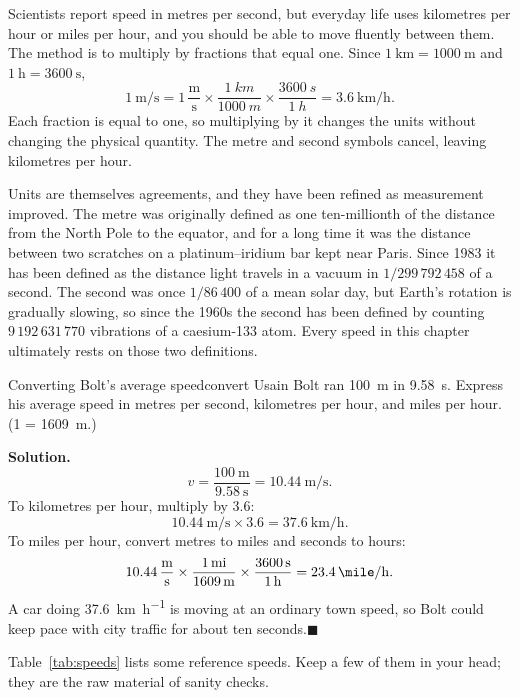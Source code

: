 \documentclass[11pt,twoside,openany]{book}
\newcounter{check}[chapter]
\newcommand{\solution}{\par\smallskip\noindent\textbf{Solution.}\ }
\newcommand{\qed}{\hfill$\blacksquare$}
\begin{document}
Scientists report speed in metres per second, but everyday life uses kilometres per hour or miles per hour, and you should be able to move fluently between them. The method is to multiply by fractions that equal one. Since $\SI{1}{\kilo\metre} = \SI{1000}{\metre}$ and $\SI{1}{\hour} = \SI{3600}{\second}$,
\[
\SI{1}{\metre\per\second}
 = 1\,\frac{\text{m}}{\text{s}}\times\frac{\SI{1}{km}}{\SI{1000}{m}}\times\frac{\SI{3600}{s}}{\SI{1}{h}}
 = \SI{3.6}{\kilo\metre\per\hour}.
\]
Each fraction is equal to one, so multiplying by it changes the units without changing the physical quantity. The metre and second symbols cancel, leaving kilometres per hour.

\begin{modelnote}
Units are themselves agreements, and they have been refined as measurement improved. The metre was originally defined as one ten-millionth of the distance from the North Pole to the equator, and for a long time it was the distance between two scratches on a platinum--iridium bar kept near Paris. Since 1983 it has been defined as the distance light travels in a vacuum in $1/299\,792\,458$ of a second. The second was once $1/86\,400$ of a mean solar day, but Earth's rotation is gradually slowing, so since the 1960s the second has been defined by counting $9\,192\,631\,770$ vibrations of a caesium-133 atom. Every speed in this chapter ultimately rests on those two definitions.
\end{modelnote}

\begin{example}{Converting Bolt's average speed}{convert}
Usain Bolt ran \SI{100}{\metre} in \SI{9.58}{\second}. Express his average speed in metres per second, kilometres per hour, and miles per hour. (\SI{1}{\mile} = \SI{1609}{\metre}.)

\solution
\[
v = \frac{\SI{100}{\metre}}{\SI{9.58}{\second}} = \SI{10.44}{\metre\per\second}.
\]
To kilometres per hour, multiply by \num{3.6}:
\[
\SI{10.44}{\metre\per\second}\times 3.6 = \SI{37.6}{\kilo\metre\per\hour}.
\]
To miles per hour, convert metres to miles and seconds to hours:
\[
10.44\,\frac{\text{m}}{\text{s}}\times\frac{\SI{1}{mi}}{\SI{1609}{m}}\times\frac{\SI{3600}{s}}{\SI{1}{h}} = \SI{23.4}{\mile\per\hour}.
\]
A car doing \SI{37.6}{\kilo\metre\per\hour} is moving at an ordinary town speed, so Bolt could keep pace with city traffic for about ten seconds.\qed
\end{example}

Table~\ref{tab:speeds} lists some reference speeds. Keep a few of them in your head; they are the raw material of sanity checks.
\end{document}
